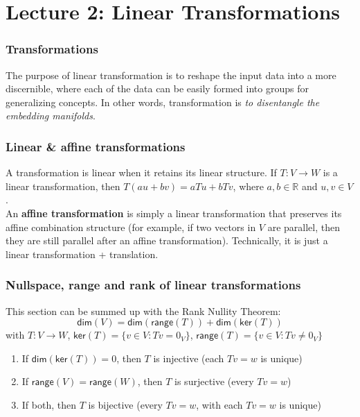 \documentclass[12pt]{article}
\begin{document}
\section*{Lecture 2: Linear Transformations}

\subsubsection*{Transformations}

The purpose of linear transformation is to reshape the input data into a more discernible, where each of the data can be easily formed into groups for generalizing concepts. In other words, transformation is \textit{to disentangle the embedding manifolds}.

\subsubsection*{Linear \& affine transformations}
A transformation is linear when it retains its linear structure. If $T: V \rightarrow W$ is a linear transformation, then $T(au+bv) = aTu + bTv$, where $a,b \in \mathbb{R}$ and $u,v \in V$.\\
An \textbf{affine transformation} is simply a linear transformation that preserves its affine combination structure (for example, if two vectors in $V$ are parallel, then they are still parallel after an affine transformation). Technically, it is just a linear transformation + translation. 


\subsubsection*{Nullspace, range and rank of linear transformations}
This section can be summed up with the Rank Nullity Theorem:
$$\textsf{dim}(V) = \textsf{dim}(\textsf{range}(T)) + \textsf{dim}(\textsf{ker}(T))$$
with $T: V \rightarrow W$, $\textsf{ker}(T) = \{v \in V : Tv = 0_V\}$, $\textsf{range}(T) = \{v\in V: Tv \neq 0_V\}$\\

\begin{enumerate}
\item If $\textsf{dim}(\textsf{ker}(T)) = 0$, then $T$ is injective (each $Tv = w$ is unique)
\item If $\textsf{range}(V)= \textsf{range}(W)$, then $T$ is surjective (every $Tv = w$)
\item If both, then $T$ is bijective (every $Tv = w$, with each $Tv = w$ is unique)
\end{enumerate}
\end{document}
